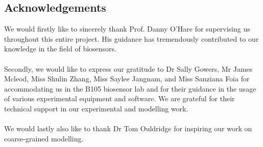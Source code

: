 \begin{titlepage}
\section*{Acknowledgements}
We would firstly like to sincerely thank Prof. Danny O'Hare for supervising us throughout this entire project. His guidance has tremendously contributed to our knowledge in the field of biosensors.\\\\
Secondly, we would like to express our gratitude to Dr Sally Gowers, Mr James Mcleod, Miss Shulin Zhang, Miss Saylee Jangnam, and Miss Sanziana Foia for accommodating us in the B105 biosensor lab and for their guidance in the usage of various experimental equipment and software. We are grateful for their technical support in our experimental and modelling work.\\\\
We would lastly also like to thank Dr Tom Ouldridge for inspiring our work on coarse-grained modelling.
\tableofcontents
\end{titlepage}
